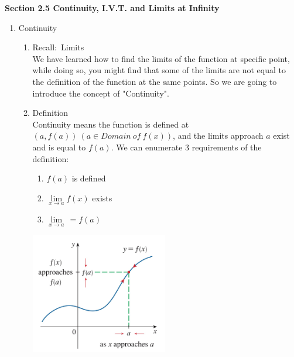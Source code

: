 \documentclass[12px]{article}
\begin{document}
\begin{center}
    \Large\textbf{Section 2.5 Continuity, I.V.T. and Limits at Infinity}
\end{center}

\begin{enumerate}
    \item Continuity
    \begin{enumerate}[(1)]
        \item Recall:\ Limits\\
        \hspace*{2em}We have learned how to find the limits of the function at specific point, while doing so, you might find that some of the limits are not equal to the definition of the function at the same points. So we are going to introduce the concept of "Continuity".\\
        \item Definition\\
        \hspace*{2em}Continuity means the function is defined at $(a, f(a))\ (a\in Domain\ of\ f(x))$, and the limits approach $a$ exist and is equal to $f(a)$. We can enumerate 3 requirements of the definition:
        \begin{multicols}{3}
            \begin{enumerate}
                \item $f(a)$ is defined
                \item $\lim\limits_{x\to a}f(x)$ exists
                \item $\lim\limits_{x\to a}\, =f(a)$
            \end{enumerate}
        \end{multicols}
        \begin{multicols}{2}
            \begin{center}
                \includegraphics[width=6cm]{Continuity.JPG}\\

\end{center}
\end{multicols}
\end{enumerate}
\end{enumerate}
\end{document}
